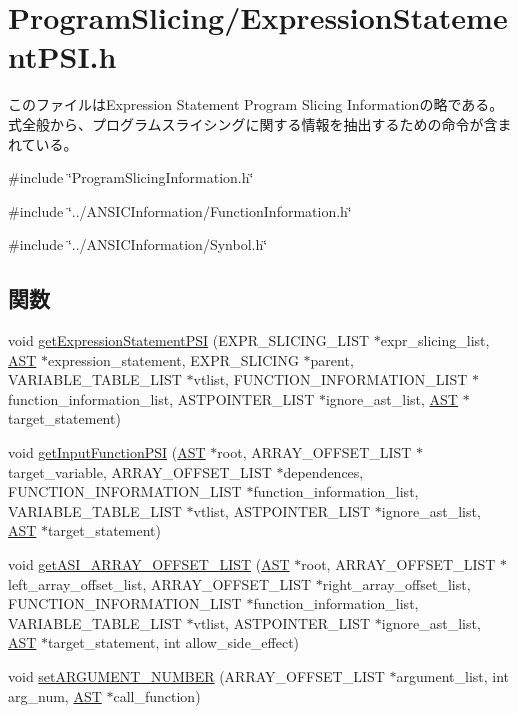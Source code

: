 \section{ProgramSlicing/ExpressionStatementPSI.h}
\label{ExpressionStatementPSI_8h}


このファイルはExpression Statement Program Slicing Informationの略である。 式全般から、プログラムスライシングに関する情報を抽出するための命令が含まれている。  


{\ttfamily \#include \char`\"{}ProgramSlicingInformation.h\char`\"{}}\par
{\ttfamily \#include \char`\"{}../ANSICInformation/FunctionInformation.h\char`\"{}}\par
{\ttfamily \#include \char`\"{}../ANSICInformation/Synbol.h\char`\"{}}\par
\subsection*{関数}
\begin{DoxyCompactItemize}
\item 
void \hyperlink{ExpressionStatementPSI_8h_a21338dbe2da2ce130f96a703c328b101}{getExpressionStatementPSI} (EXPR\_\-SLICING\_\-LIST $\ast$expr\_\-slicing\_\-list, \hyperlink{structabstract__syntax__tree}{AST} $\ast$expression\_\-statement, EXPR\_\-SLICING $\ast$parent, VARIABLE\_\-TABLE\_\-LIST $\ast$vtlist, FUNCTION\_\-INFORMATION\_\-LIST $\ast$function\_\-information\_\-list, ASTPOINTER\_\-LIST $\ast$ignore\_\-ast\_\-list, \hyperlink{structabstract__syntax__tree}{AST} $\ast$target\_\-statement)
\item 
void \hyperlink{ExpressionStatementPSI_8h_a9ad98d9ff8db24ebafe23bbbfa6eae26}{getInputFunctionPSI} (\hyperlink{structabstract__syntax__tree}{AST} $\ast$root, ARRAY\_\-OFFSET\_\-LIST $\ast$target\_\-variable, ARRAY\_\-OFFSET\_\-LIST $\ast$dependences, FUNCTION\_\-INFORMATION\_\-LIST $\ast$function\_\-information\_\-list, VARIABLE\_\-TABLE\_\-LIST $\ast$vtlist, ASTPOINTER\_\-LIST $\ast$ignore\_\-ast\_\-list, \hyperlink{structabstract__syntax__tree}{AST} $\ast$target\_\-statement)
\item 
void \hyperlink{ExpressionStatementPSI_8h_a5fa8837a82cd901ff558fdfac5a83808}{getASI\_\-ARRAY\_\-OFFSET\_\-LIST} (\hyperlink{structabstract__syntax__tree}{AST} $\ast$root, ARRAY\_\-OFFSET\_\-LIST $\ast$left\_\-array\_\-offset\_\-list, ARRAY\_\-OFFSET\_\-LIST $\ast$right\_\-array\_\-offset\_\-list, FUNCTION\_\-INFORMATION\_\-LIST $\ast$function\_\-information\_\-list, VARIABLE\_\-TABLE\_\-LIST $\ast$vtlist, ASTPOINTER\_\-LIST $\ast$ignore\_\-ast\_\-list, \hyperlink{structabstract__syntax__tree}{AST} $\ast$target\_\-statement, int allow\_\-side\_\-effect)
\item 
void \hyperlink{ExpressionStatementPSI_8h_a3edc8c77cb40c3d9876beebeb0888645}{setARGUMENT\_\-NUMBER} (ARRAY\_\-OFFSET\_\-LIST $\ast$argument\_\-list, int arg\_\-num, \hyperlink{structabstract__syntax__tree}{AST} $\ast$call\_\-function)
\end{DoxyCompactItemize}


